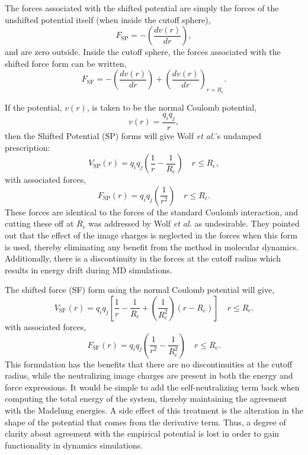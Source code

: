 \documentclass[letterpaper]{report}
\begin{document}
The forces associated with the shifted potential are simply the forces
of the unshifted potential itself (when inside the cutoff sphere),
\begin{equation}
F_{\textrm{SP}} = -\left( \frac{d v(r)}{dr} \right),
\end{equation}
and are zero outside.  Inside the cutoff sphere, the forces associated
with the shifted force form can be written,
\begin{equation}
F_{\textrm{SF}} = -\left( \frac{d v(r)}{dr} \right) + \left(\frac{d
v(r)}{dr} \right)_{r=R_\textrm{c}}.
\end{equation}
 
If the potential, $v(r)$, is taken to be the normal Coulomb potential,
\begin{equation}
v(r) = \frac{q_i q_j}{r},
\label{eq:Coulomb}
\end{equation}
then the Shifted Potential (SP) forms will give Wolf {\it et
al.}'s undamped prescription:
\begin{equation}
V_\textrm{SP}(r) =
q_iq_j\left(\frac{1}{r}-\frac{1}{R_\textrm{c}}\right) \quad
r\leqslant R_\textrm{c},
\label{eq:SPPot}
\end{equation}
with associated forces,
\begin{equation}
F_\textrm{SP}(r) = q_iq_j\left(\frac{1}{r^2}\right) \quad r\leqslant R_\textrm{c
}.
\label{eq:SPForces}
\end{equation}
These forces are identical to the forces of the standard Coulomb
interaction, and cutting these off at $R_c$ was addressed by Wolf
\textit{et al.} as undesirable.  They pointed out that the effect of
the image charges is neglected in the forces when this form is
used,\cite{Wolf99} thereby eliminating any benefit from the method in
molecular dynamics.  Additionally, there is a discontinuity in the
forces at the cutoff radius which results in energy drift during MD
simulations.

The shifted force (SF) form using the normal Coulomb potential
will give,
\begin{equation}
V_\textrm{SF}(r) = q_iq_j\left[\frac{1}{r}-\frac{1}{R_\textrm{c}}+\left(\frac{1}
{R_\textrm{c}^2}\right)(r-R_\textrm{c})\right] \quad r\leqslant R_\textrm{c}.
\label{eq:SFPot}
\end{equation}
with associated forces,
\begin{equation}
F_\textrm{SF}(r) =  q_iq_j\left(\frac{1}{r^2}-\frac{1}{R_\textrm{c}^2}\right) \quad r\leqslant R_\textrm{c}.
\label{eq:SFForces}
\end{equation}
This formulation has the benefits that there are no discontinuities at
the cutoff radius, while the neutralizing image charges are present in
both the energy and force expressions.  It would be simple to add the
self-neutralizing term back when computing the total energy of the
system, thereby maintaining the agreement with the Madelung energies.
A side effect of this treatment is the alteration in the shape of the
potential that comes from the derivative term.  Thus, a degree of
clarity about agreement with the empirical potential is lost in order
to gain functionality in dynamics simulations.
\end{document}
